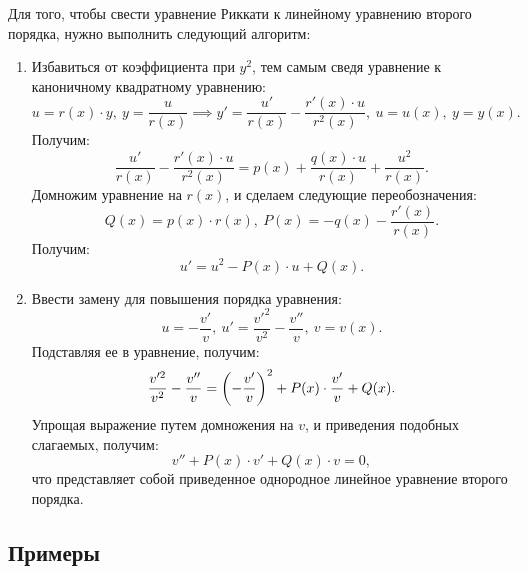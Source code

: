 	Для того, чтобы свести уравнение Риккати к линейному уравнению второго порядка, нужно выполнить следующий алгоритм:
	\begin{enumerate}
		\item Избавиться от коэффициента при $y^2$, тем самым сведя уравнение к каноничному квадратному уравнению:
		\[ u = r(x) \cdot y, ~ y = \frac{u}{r(x)} \implies y' = \frac{u'}{r(x)} - \frac{r'(x) \cdot u}{r^2(x)}, ~ u = u(x), ~ y = y(x). \]
		Получим:
		\[ \frac{u'}{r(x)} - \frac{r'(x) \cdot u}{r^2(x)} = p(x) + \frac{q(x) \cdot u}{r(x)} + \frac{u^2}{r(x)}. \]
		Домножим уравнение на $r(x)$, и сделаем следующие переобозначения:
		\[ Q(x) = p(x) \cdot r(x), ~ P(x) = - q(x) - \frac{r'(x)}{r(x)}. \]
		Получим:
		\[ u' = u^2 - P(x) \cdot u + Q(x). \]
		\item Ввести замену для повышения порядка уравнения:
		\[ u = -\frac{v'}{v}, ~ u' = \frac{v'^2}{v^2} - \frac{v''}{v}, ~ v = v(x). \]
		Подставляя ее в уравнение, получим:
		\[ \frac{v'^2}{v^2} - \frac{v''}{v} = \left( -\frac{v'}{v} \right)^2 + P(x) \cdot \frac{v'}{v} + Q(x). \]
		Упрощая выражение путем домножения на $v$, и приведения подобных слагаемых, получим:
		\[ v'' + P(x) \cdot v' + Q(x) \cdot v = 0, \]
		что представляет собой приведенное однородное линейное уравнение второго порядка.
	\end{enumerate}

	\subsection{Примеры}


